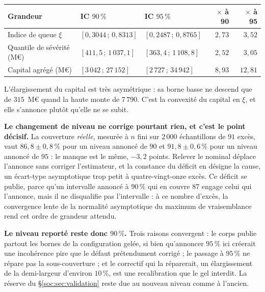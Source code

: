\begin{center}\footnotesize
\renewcommand{\arraystretch}{1.25}
\begin{tabular}{@{}l l l r r@{}}
\toprule
\textbf{Grandeur} & \textbf{IC $90\,\%$} & \textbf{IC $95\,\%$} & \textbf{$\times$ à 90} & \textbf{$\times$ à 95} \\
\midrule
Indice de queue $\xi$ & $[0{,}3044\,;\,0{,}8313]$ & $[0{,}2487\,;\,0{,}8765]$ & $2{,}73$ & $3{,}52$ \\
Quantile de sévérité (M\euro) & $[411{,}5\,;\,1\,037{,}1]$ & $[363{,}4\,;\,1\,108{,}8]$ & $2{,}52$ & $3{,}05$ \\
Capital agrégé (M\euro) & $[3\,042\,;\,27\,152]$ & $[2\,727\,;\,34\,942]$ & $8{,}93$ & $12{,}81$ \\
\bottomrule
\end{tabular}
\end{center}

\vspace{4pt}
\noindent L'élargissement du capital est très asymétrique : sa borne basse ne descend que de
$315$~M\euro{} quand la haute monte de $7\,790$. C'est la convexité du capital en $\xi$, et elle
s'annonce plutôt qu'elle ne se subit.

\textbf{Le changement de niveau ne corrige pourtant rien, et c'est le point décisif.} La couverture
\emph{réelle}, mesurée à $n$ fini sur $2\,000$ échantillons de $91$ excès, vaut
$86{,}8 \pm 0{,}8\,\%$ pour un niveau annoncé de $90$ et $91{,}8 \pm 0{,}6\,\%$ pour un niveau
annoncé de $95$ : le manque est le même, $-3{,}2$ points. Relever le nominal déplace l'annonce sans
corriger l'estimateur, et la constance du déficit en désigne la cause, un écart-type asymptotique
trop petit à quatre-vingt-onze excès. Ce déficit se publie, parce qu'un intervalle annoncé à
$90\,\%$ qui en couvre $87$ engage celui qui l'annonce, mais il ne disqualifie pas l'intervalle :
à ce nombre d'excès, la convergence lente de la normalité asymptotique du maximum de vraisemblance
rend cet ordre de grandeur attendu.

\textbf{Le niveau reporté reste donc $90\,\%$.} Trois raisons convergent : le corps publie partout
les bornes de la configuration gelée, si bien qu'annoncer $95\,\%$ ici créerait une incohérence
pire que le défaut prétendument corrigé ; le passage à $95\,\%$ ne répare pas la sous-couverture ;
et le correctif qui la réparerait, un élargissement de la demi-largeur d'environ $10\,\%$, est une
recalibration que le gel interdit. La réserve du \S\ref{soc:sec:validation} reste due au nouveau
niveau comme à l'ancien.

